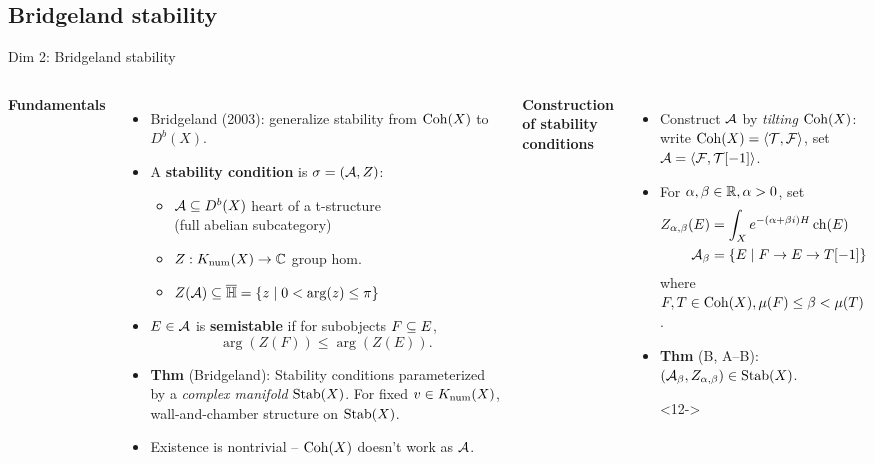 \documentclass[8pt,handout]{beamer} %
\begin{document}
\subsection{Bridgeland stability}
\begin{frame}{Dim 2: Bridgeland stability}
    \begin{columns}[t]
        \textbf{Fundamentals}
        \begin{itemize}
            \item<2-> Bridgeland (2003): generalize stability from $\Coh(X)$ to $D^b(X)$.
            \item<3-> A \textbf{stability condition} is $\si = (\sA, Z)$:
            \begin{itemize}
                \item<4-> $\sA \subs D^b(X)$ heart of a t-structure \\
                \qquad\qquad (full abelian subcategory)
                \item<5-> $Z: \Kn(X) \to \C$ group hom.
                \item<6-> $Z(\sA) \subs \Hb = \{ z \;|\; 0 < \arg(z) \le \pi \}$
            \end{itemize}
            \item<7-> $E \in \sA$ is \textbf{semistable} if for subobjects $F \subs E$,
            \[ \arg(Z(F)) \le \arg(Z(E)). \]
            \item<8-> \textbf{Thm} (Bridgeland): Stability conditions parameterized by a \textit{complex manifold} $\Stab(X)$. For fixed $v \in \Kn(X)$, wall-and-chamber structure on $\Stab(X)$.
            \item<9-> Existence is nontrivial -- $\Coh(X)$ doesn't work as $\sA$.
        \end{itemize}
        
        \textbf{Construction of stability conditions}
        \begin{itemize}
            \item<10-> Construct $\sA$ by \textit{tilting} $\Coh(X)$: %
            write $\Coh(X) = \langle \sT, \sF \rangle$, set $\sA = \langle \sF, \sT[-1] \rangle$.
            \item<11-> For $\al, \be \in \R, \al > 0$, set
            \begin{align*}
                Z_{\al, \be}(E) & = \int_X e^{-(\al + \be i)H}\ch(E) \\
                \sA_\be & = \{ E \;|\; F \to E \to T[-1] \}
            \end{align*}
            where $F, T \in \Coh(X), \mu(F) \le \be < \mu(T)$.
            \item<11-> \textbf{Thm} (B, A--B): $(\sA_\be, Z_{\al,\be}) \in \Stab(X)$.
            \item[]<12->
            \begin{center}
        \begin{tikzpicture}[scale=0.5]


\end{tikzpicture}
\end{center}
\end{itemize}
\end{columns}
\end{frame}
\end{document}
